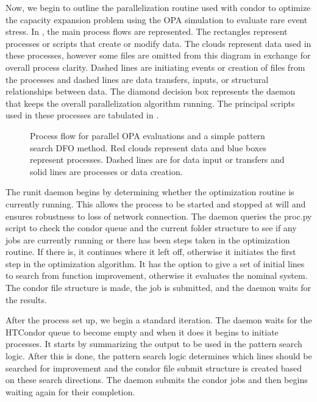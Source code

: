 Now, we begin to outline the parallelization routine used with condor to optimize the capacity expansion problem using the OPA simulation to evaluate rare event stress.  In , the main process flows are represented.  The rectangles represent processes or scripts that create or modify data.  The clouds represent data used in these processes, however some files are omitted from this diagram in exchange for overall process clarity.  Dashed lines are initiating events or creation of files from the processes and dashed lines are data transfers, inputs, or structural relationships between data.  The diamond decision box represents the daemon that keeps the overall parallelization algorithm running.  The principal scripts used in these processes are tabulated in .

\linespread{1}
\begin{figure}
\centering
\footnotesize

\caption[Process flow for parallel OPA evaluations]{Process flow for parallel OPA evaluations and a simple pattern search DFO method.  Red clouds represent data and blue boxes represent processes.  Dashed lines are for data input or transfers and solid lines are processes or data creation. }
\label{fig:parallel}
\end{figure}
\linespread{2}

The runit daemon begins by determining whether the optimization routine is currently running.  This allows the process to be started and stopped at will and ensures robustness to loss of network connection.  The daemon queries the proc.py script to check the condor queue and the current folder structure to see if any jobs are currently running or there has been steps taken in the optimization routine.  If there is, it continues where it left off, otherwise it initiates the first step in the optimization algorithm.  It has the option to give a set of initial lines to search from function improvement, otherwise it evaluates the nominal system.  The condor file structure is made, the job is submitted, and the daemon waits for the results.

After the process set up, we begin a standard iteration.  The daemon waits for the HTCondor queue to become empty and when it does it begins to initiate processes.  It starts by summarizing the output to be used in the pattern search logic.  After this is done, the pattern search logic determines which lines should be searched for improvement and the condor file submit structure is created based on these search directions.  The daemon submits the condor jobs and then begins waiting again for their completion.

